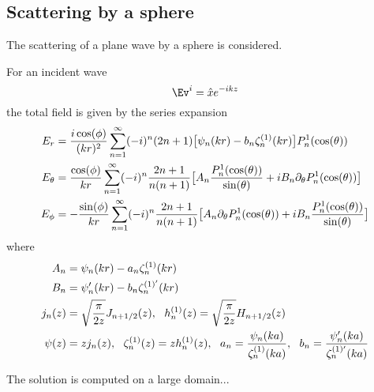 \subsection{Scattering by a sphere}

The scattering of a plane wave by a sphere is considered.

For an incident wave
\[
   \Ev^i = \hat{x} e^{-ikz}
\]
the total field is given by the series expansion
\begin{align*}
   E_r &= {i\cos(\phi)\over (kr)^2} 
              \sum_{n=1}^\infty (-i)^n (2n+1)\big[ \psi_n(kr) - b_n \zeta_n^{(1)}(kr)\big] P_n^1(\cos(\theta)) \\
   E_\theta &= {\cos(\phi)\over kr}
              \sum_{n=1}^\infty (-i)^n {2n+1 \over n(n+1)}
                 \big[ A_n {P_n^1(\cos(\theta)) \over \sin(\theta)}
                      +i B_n \partial_\theta P_n^1(\cos(\theta)) \big] \\
   E_\phi &= -{\sin(\phi)\over kr}
              \sum_{n=1}^\infty (-i)^n {2n+1 \over n(n+1)}
                 \big[ A_n \partial_\theta P_n^1(\cos(\theta))
                      +i B_n {P_n^1(\cos(\theta)) \over \sin(\theta)} \big] \\ 
\end{align*}
where
\begin{align*}
 A_n &= \psi_n(kr) - a_n \zeta_n^{(1)}(kr) \\
 B_n &= \psi_n'(kr) - b_n \zeta_n^{(1)'}(kr) \\
  j_n(z) &= \sqrt{\pi\over 2 z} J_{n+1/2}(z), ~~ h_n^{(1)}(z)= \sqrt{\pi\over 2 z} H_{n+1/2}(z) \\
  \psi(z) &= z j_n(z), ~~ \zeta_n^{(1)}(z)= z h_n^{(1)}(z), ~~ a_n={\psi_n(ka)\over \zeta_n^{(1)}(ka)}, ~~
       b_n ={\psi_n'(ka)\over \zeta_n^{(1)'}(ka)}
\end{align*}

The solution is computed on a large domain... 



